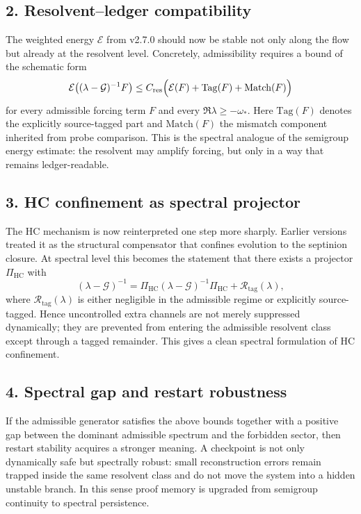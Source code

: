 \subsection*{2. Resolvent--ledger compatibility}
The weighted energy $\mathcal E$ from v2.7.0 should now be stable not only along the
flow but already at the resolvent level. Concretely, admissibility requires a bound
of the schematic form
\[
\mathcal E\bigl((\lambda-\mathcal G)^{-1}F\bigr)
\le C_{\mathrm{res}}
\Bigl( \mathcal E(F)
+ \mathrm{Tag}(F)
+ \mathrm{Match}(F)\Bigr)
\]
for every admissible forcing term $F$ and every $\Re\lambda\ge -\omega_*$. Here
$\mathrm{Tag}(F)$ denotes the explicitly source-tagged part and
$\mathrm{Match}(F)$ the mismatch component inherited from probe comparison. This is
the spectral analogue of the semigroup energy estimate: the resolvent may amplify
forcing, but only in a way that remains ledger-readable.

\subsection*{3. HC confinement as spectral projector}
The HC mechanism is now reinterpreted one step more sharply. Earlier versions treated
it as the structural compensator that confines evolution to the septinion closure.
At spectral level this becomes the statement that there exists a projector
$\Pi_{\mathrm{HC}}$ with
\[
(\lambda-\mathcal G)^{-1}
= \Pi_{\mathrm{HC}}(\lambda-\mathcal G)^{-1}\Pi_{\mathrm{HC}}
+ \mathcal R_{\mathrm{tag}}(\lambda),
\]
where $\mathcal R_{\mathrm{tag}}(\lambda)$ is either negligible in the admissible
regime or explicitly source-tagged. Hence uncontrolled extra channels are not merely
suppressed dynamically; they are prevented from entering the admissible resolvent
class except through a tagged remainder. This gives a clean spectral formulation of
HC confinement.

\subsection*{4. Spectral gap and restart robustness}
If the admissible generator satisfies the above bounds together with a positive gap
between the dominant admissible spectrum and the forbidden sector, then restart
stability acquires a stronger meaning. A checkpoint is not only dynamically safe but
spectrally robust: small reconstruction errors remain trapped inside the same
resolvent class and do not move the system into a hidden unstable branch. In this
sense proof memory is upgraded from semigroup continuity to spectral persistence.


